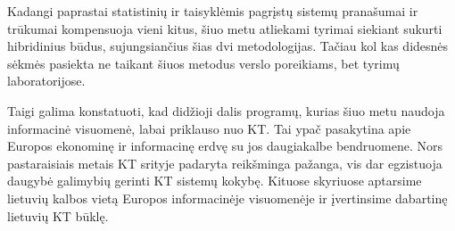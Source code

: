 \documentclass[]{../metanetpaper}
\begin{document}
\begin{multicols}{2}
Kadangi paprastai statistinių ir taisyklėmis pagrįstų sistemų pranašumai ir trūkumai kompensuoja vieni kitus, šiuo metu atliekami tyrimai siekiant sukurti hibridinius būdus, sujungsiančius šias dvi metodologijas. Tačiau kol kas didesnės sėkmės pasiekta ne taikant šiuos metodus verslo poreikiams, bet tyrimų laboratorijose. 

Taigi galima konstatuoti, kad didžioji dalis programų, kurias šiuo metu naudoja informacinė visuomenė, labai priklauso nuo KT. Tai ypač pasakytina apie Europos ekonominę ir informacinę erdvę su jos daugiakalbe bendruomene. Nors pastaraisiais metais KT srityje padaryta reikšminga pažanga, vis dar egzistuoja daugybė galimybių gerinti KT sistemų kokybę. Kituose skyriuose aptarsime lietuvių kalbos vietą Europos informacinėje visuomenėje ir įvertinsime dabartinę lietuvių KT būklę.
\end{multicols}

\clearpage


\end{document}
